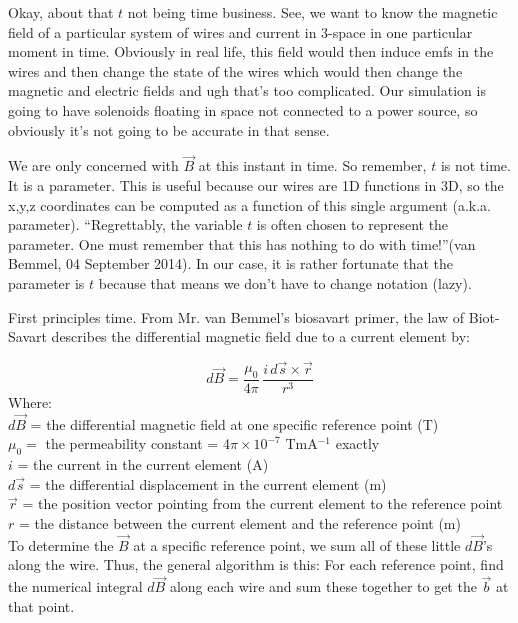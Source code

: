 \documentclass[12pt]{article}
\newcommand{\spaces}{\phantom{\qquad}}
\begin{document}
	Okay, about that $t$ not being time business. See, we want to know the magnetic field of a particular system of wires and current in 3-space in one particular moment in time. Obviously in real life, this field would then induce emfs in the wires and then change the state of the wires which would then change the magnetic and electric fields and ugh that's too complicated. Our simulation is going to have solenoids floating in space not connected to a power source, so obviously it's not going to be accurate in that sense.
	
	We are only concerned with $\vec{B}$ at this instant in time. So remember, $t$ is not time. It is a parameter. This is useful because our wires are 1D functions in 3D, so the x,y,z coordinates can be computed as a function of this single argument (a.k.a. parameter). ``Regrettably, the variable $t$ is often chosen to represent the parameter. One must remember that this has nothing to do with time!''(van Bemmel, 04 September 2014). In our case, it is rather fortunate that the parameter is $t$ because that means we don't have to change notation (lazy).
	
	First principles time. From Mr. van Bemmel's biosavart primer, the law of Biot-Savart describes the differential magnetic field due to a current element by:
	
			$$d\vec{B} = \frac{\mu_0}{4\pi} \, \frac{i\,d\vec{s} \times \vec{r}}{r^3}$$			
	Where: \\
		\spaces $d\vec{B}$ = the differential magnetic field at one specific reference point (T) \\
		\spaces $\mu_0 =$ the permeability constant = 4$\pi \times 10^{-7}$ TmA$^{-1}$ exactly \\		
		\spaces $i$ = the current in the current element (A) \\
		\spaces $d\vec{s}$ = the differential displacement in the current element (m) \\
		\spaces $\vec{r}$ = the position vector pointing from the current element to the reference point \\
		\spaces $r$ = the distance between the current element and the reference point (m)\\
		
	To determine the $\vec{B}$ at a specific reference point, we sum all of these little $d\vec{B}$'s along the wire. Thus, the general algorithm is this: For each reference point, find the numerical integral $d\vec{B}$ along each wire and sum these together to get the $\vec{b}$ at that point.
	
\end{document}
